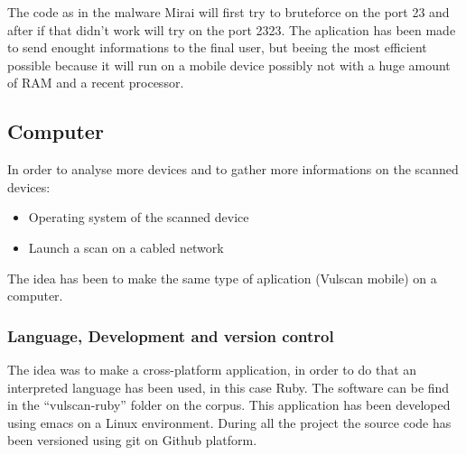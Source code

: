 \documentclass{report}
\begin{document}
The code as in the malware Mirai will first try to bruteforce on the port 23 and after if that didn't work will try on the port 2323.\newline
The aplication has been made to send enought informations to the final user, but beeing the most efficient possible because it will run on a mobile device possibly not with a huge amount of RAM and a recent processor.

\subsection{Computer}
In order to analyse more devices and to gather more informations on the scanned devices:
\begin{itemize}
 \item Operating system of the scanned device
 \item Launch a scan on a cabled network
\end{itemize}
The idea has been to make the same type of aplication (Vulscan mobile) on a computer.

\subsubsection{Language, Development and version control}
The idea was to make a cross-platform application, in order to do that an interpreted language has been used, in this case Ruby.
The software can be find in the ``vulscan-ruby'' folder on the corpus. This application has been developed using emacs on a Linux environment.\newline
During all the project the source code has been versioned using git on Github platform.
\end{document}
